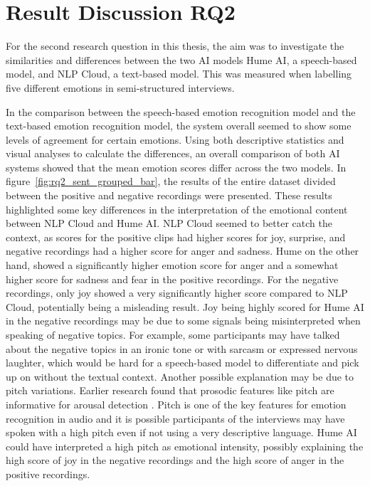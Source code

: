 
\section{Result Discussion RQ2}
For the second research question in this thesis, the aim was to investigate the similarities and differences between the two AI models Hume AI, a speech-based model, and NLP Cloud, a text-based model. This was measured when labelling five different emotions in semi-structured interviews.

\label{subsec:RQ2interpretation}
In the comparison between the speech-based emotion recognition model and the text-based emotion recognition model, the system overall seemed to show some levels of agreement for certain emotions. Using both descriptive statistics and visual analyses to calculate the differences, an overall comparison of both AI systems showed that the mean emotion scores differ across the two models.
In figure~\ref{fig:rq2_sent_grouped_bar}, the results of the entire dataset divided between the positive and negative recordings were presented. These results highlighted some key differences in the interpretation of the emotional content between NLP Cloud and Hume AI. NLP Cloud seemed to better catch the context, as scores for the positive clips had higher scores for joy, surprise, and negative recordings had a higher score for anger and sadness. 
Hume on the other hand, showed a significantly higher emotion score for anger and a somewhat higher score for sadness and fear in the positive recordings. For the negative recordings, only joy showed a very significantly higher score compared to NLP Cloud, potentially being a misleading result. Joy being highly scored for Hume AI in the negative recordings may be due to some signals being misinterpreted when speaking of negative topics. For example, some participants may have talked about the negative topics in an ironic tone or with sarcasm or expressed nervous laughter, which would be hard for a speech-based model to differentiate and pick up on without the textual context.
Another possible explanation may be due to pitch variations. Earlier research found that prosodic features like pitch are informative for arousal detection \autocite{Soleymani2017}. Pitch is one of the key features for emotion recognition in audio and it is possible participants of the interviews may have spoken with a high pitch even if not using a very descriptive language. Hume AI could have interpreted a high pitch as emotional intensity, possibly explaining the high score of joy in the negative recordings and the high score of anger in the positive recordings.

